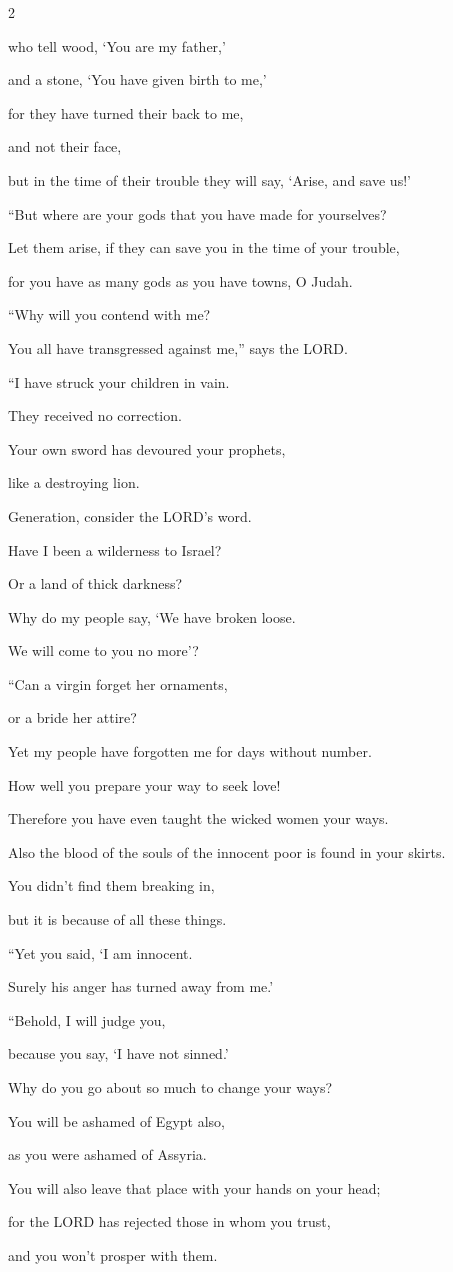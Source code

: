 \begin{multicols}{2}
	
	\myverse{}who tell wood, ‘You are my father,’
	
	and a stone, ‘You have given birth to me,’
	
	for they have turned their back to me,
	
	and not their face,
	
	but in the time of their trouble they will say, ‘Arise, and save us!’
	
	
	\myverse{}“But where are your gods that you have made for yourselves?
	
	Let them arise, if they can save you in the time of your trouble,
	
	for you have as many gods as you have towns, O Judah.
	
	
	\myverse{}“Why will you contend with me?
	
	You all have transgressed against me,” says the LORD.
	
	
	\myverse{}“I have struck your children in vain.
	
	They received no correction.
	
	Your own sword has devoured your prophets,
	
	like a destroying lion.
	
	
	\myverse{}Generation, consider the LORD’s word.
	
	Have I been a wilderness to Israel?
	
	Or a land of thick darkness?
	
	Why do my people say, ‘We have broken loose.
	
	We will come to you no more’?
	
	
	\myverse{}“Can a virgin forget her ornaments,
	
	or a bride her attire?
	
	Yet my people have forgotten me for days without number.
	
	
	\myverse{}How well you prepare your way to seek love!
	
	Therefore you have even taught the wicked women your ways.
	
	
	\myverse{}Also the blood of the souls of the innocent poor is found in
	your skirts.
	
	You didn’t find them breaking in,
	
	but it is because of all these things.
	
	
	\myverse{}“Yet you said, ‘I am innocent.
	
	Surely his anger has turned away from me.’
	
	“Behold, I will judge you,
	
	because you say, ‘I have not sinned.’
	
	
	\myverse{}Why do you go about so much to change your ways?
	
	You will be ashamed of Egypt also,
	
	as you were ashamed of Assyria.
	
	
	\myverse{}You will also leave that place with your hands on your head;
	
	for the LORD has rejected those in whom you trust,
	
	and you won’t prosper with them.
\end{multicols}

